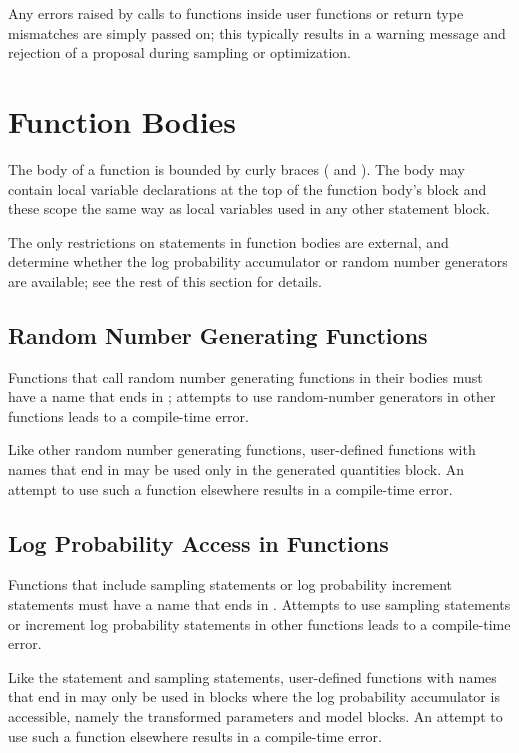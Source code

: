 Any errors raised by calls to functions inside user functions or
return type mismatches are simply passed on;  this typically results
in a warning message and rejection of a proposal during sampling or
optimization.  

\section{Function Bodies}\label{function-bodies.section}

The body of a function is bounded by curly braces (\code{\{} and
\code{\}}).  The body may contain local variable declarations at the
top of the function body's block and these scope the same way as local
variables used in any other statement block.

The only restrictions on statements in function bodies are external,
and determine whether the log probability accumulator or random
number generators are available;  see the rest of this section for details.

\subsection{Random Number Generating Functions}

Functions that call random number generating functions in their bodies
must have a name that ends in ; attempts to use
random-number generators in other functions leads to a compile-time
error. 

Like other random number generating functions, user-defined functions
with names that end in  may be used only in the generated
quantities block.  An attempt to use such a function elsewhere results
in a compile-time error.

\subsection{Log Probability Access in Functions}

Functions that include sampling statements or log probability
increment statements must have a name that ends in .
Attempts to use sampling statements or increment log probability
statements in other functions leads to a compile-time error.

Like the  statement and sampling
statements, user-defined functions with names that end in 
may only be used in blocks where the log probability accumulator is
accessible, namely the transformed parameters and model blocks.  An
attempt to use such a function elsewhere results in a compile-time
error.

